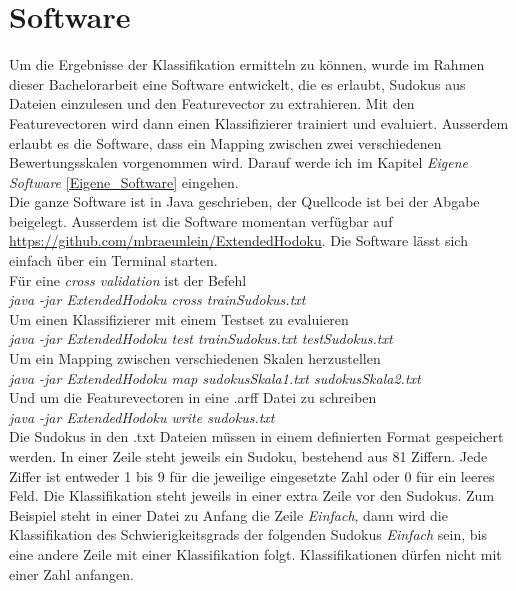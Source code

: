 \chapter{Software}
Um die Ergebnisse der Klassifikation ermitteln zu können, wurde im Rahmen dieser Bachelorarbeit eine Software entwickelt, die es erlaubt, Sudokus aus Dateien einzulesen und den Featurevector zu extrahieren. Mit den Featurevectoren wird dann einen Klassifizierer trainiert und evaluiert. Ausserdem erlaubt es die Software, dass ein Mapping zwischen zwei verschiedenen Bewertungsskalen vorgenommen wird. Darauf werde ich im Kapitel \textit{Eigene Software} \ref{Eigene_Software} eingehen.\\
Die ganze Software ist in Java geschrieben, der Quellcode ist bei der Abgabe beigelegt. Ausserdem ist die Software momentan verfügbar auf \url{https://github.com/mbraeunlein/ExtendedHodoku}. Die Software lässt sich einfach über ein Terminal starten.\\[1em]
Für eine \textit{cross validation} ist der Befehl\\
\textit{java -jar ExtendedHodoku cross trainSudokus.txt}\\[1em]
Um einen Klassifizierer mit einem Testset zu evaluieren\\
\textit{java -jar ExtendedHodoku test trainSudokus.txt testSudokus.txt}\\[1em]
Um ein Mapping zwischen verschiedenen Skalen herzustellen\\
\textit{java -jar ExtendedHodoku map sudokusSkala1.txt sudokusSkala2.txt}\\[1em]
Und um die Featurevectoren in eine .arff Datei zu schreiben\\
\textit{java -jar ExtendedHodoku write sudokus.txt}\\[1em]
\label{Sudoku_Format}
Die Sudokus in den .txt Dateien müssen in einem definierten Format gespeichert werden. In einer Zeile steht jeweils ein Sudoku, bestehend aus 81 Ziffern. Jede Ziffer ist entweder 1 bis 9 für die jeweilige eingesetzte Zahl oder 0 für ein leeres Feld. Die Klassifikation steht jeweils in einer extra Zeile vor den Sudokus. Zum Beispiel steht in einer Datei zu Anfang die Zeile \textit{Einfach}, dann wird die Klassifikation des Schwierigkeitsgrads der folgenden Sudokus \textit{Einfach} sein, bis eine andere Zeile mit einer Klassifikation folgt. Klassifikationen dürfen nicht mit einer Zahl anfangen.